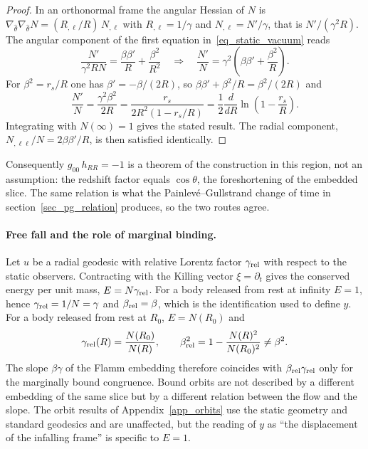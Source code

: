 \documentclass[pdflatex,sn-mathphys-num]{sn-jnl}%
\theoremstyle{thmstyleone}%
\theoremstyle{thmstyletwo}%
\theoremstyle{thmstylethree}%
\begin{document}
\begin{proof}
In an orthonormal frame the angular Hessian of $N$ is $\nabla_{\hat\theta}\nabla_{\hat\theta}N=(R_{,\ell}/R)\,N_{,\ell}$ with $R_{,\ell}=1/\gamma$ and $N_{,\ell}=N'/\gamma$, that is $N'/(\gamma^2R)$. The angular component of the first equation in~\eqref{eq_static_vacuum} reads
\begin{equation}
    \frac{N'}{\gamma^2RN}=\frac{\beta\beta'}{R}+\frac{\beta^2}{R^2}
    \quad\Longrightarrow\quad
    \frac{N'}{N}=\gamma^2\left(\beta\beta'+\frac{\beta^2}{R}\right).
\end{equation}
For $\beta^2=r_s/R$ one has $\beta'=-\beta/(2R)$, so $\beta\beta'+\beta^2/R=\beta^2/(2R)$ and
\begin{equation}
    \frac{N'}{N}=\frac{\gamma^2\beta^2}{2R}=\frac{r_s}{2R^2\left(1-r_s/R\right)}=\frac12\frac{d}{dR}\ln\!\left(1-\frac{r_s}{R}\right).
\end{equation}
Integrating with $N(\infty)=1$ gives the stated result. The radial component, $N_{,\ell\ell}/N=2\beta\beta'/R$, is then satisfied identically.
\end{proof}

Consequently $g_{00}\,h_{RR}=-1$ is a theorem of the construction in this region, not an assumption: the redshift factor equals $\cos\theta$, the foreshortening of the embedded slice. The same relation is what the Painlev\'e--Gullstrand change of time in section~\ref{sec_pg_relation} produces, so the two routes agree.

\paragraph{Free fall and the role of marginal binding.}
Let $u$ be a radial geodesic with relative Lorentz factor $\gamma_{\rm rel}$ with respect to the static observers. Contracting with the Killing vector $\xi=\partial_t$ gives the conserved energy per unit mass, $E=N\gamma_{\rm rel}$. For a body released from rest at infinity $E=1$, hence $\gamma_{\rm rel}=1/N=\gamma$ and $\beta_{\rm rel}=\beta$, which is the identification used to define $y$. For a body released from rest at $R_0$, $E=N(R_0)$ and
\begin{equation}
    \gamma_{\rm rel}(R)=\frac{N(R_0)}{N(R)},
    \qquad
    \beta_{\rm rel}^2=1-\frac{N(R)^2}{N(R_0)^2}\neq\beta^2 .
\end{equation}
The slope $\beta\gamma$ of the Flamm embedding therefore coincides with $\beta_{\rm rel}\gamma_{\rm rel}$ only for the marginally bound congruence. Bound orbits are not described by a different embedding of the same slice but by a different relation between the flow and the slope. The orbit results of Appendix~\ref{app_orbits} use the static geometry and standard geodesics and are unaffected, but the reading of $y$ as ``the displacement of the infalling frame'' is specific to $E=1$.
\end{document}
